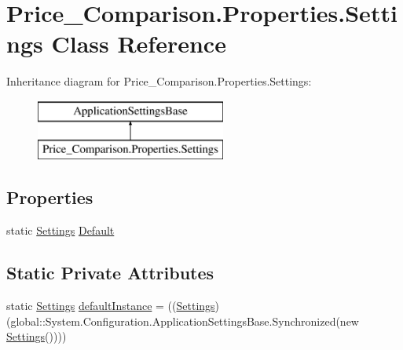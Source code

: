 \hypertarget{class_price___comparison_1_1_properties_1_1_settings}{\section{Price\-\_\-\-Comparison.\-Properties.\-Settings Class Reference}
\label{class_price___comparison_1_1_properties_1_1_settings}
}
Inheritance diagram for Price\-\_\-\-Comparison.\-Properties.\-Settings\-:\begin{figure}[H]
\begin{center}
\leavevmode
\includegraphics[height=2.000000cm]{class_price___comparison_1_1_properties_1_1_settings}
\end{center}
\end{figure}
\subsection*{Properties}
\begin{DoxyCompactItemize}
\item 
static \hyperlink{class_price___comparison_1_1_properties_1_1_settings}{Settings} \hyperlink{class_price___comparison_1_1_properties_1_1_settings_aee3de7b3f05463fe9e7255cd21ef15d3}{Default}
\end{DoxyCompactItemize}
\subsection*{Static Private Attributes}
\begin{DoxyCompactItemize}
\item 
static \hyperlink{class_price___comparison_1_1_properties_1_1_settings}{Settings} \hyperlink{class_price___comparison_1_1_properties_1_1_settings_a2088e8d1c54b01a18c77c02bf54d95ff}{default\-Instance} = ((\hyperlink{class_price___comparison_1_1_properties_1_1_settings}{Settings})(global\-::\-System.\-Configuration.\-Application\-Settings\-Base.\-Synchronized(new \hyperlink{class_price___comparison_1_1_properties_1_1_settings}{Settings}())))
\end{DoxyCompactItemize}


